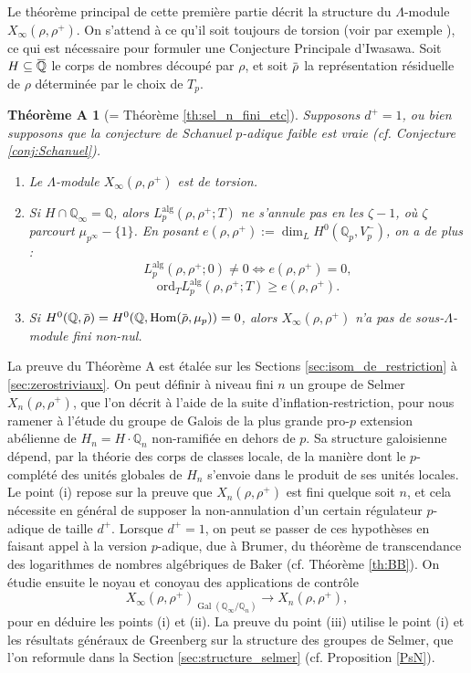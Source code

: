 \documentclass[12pt]{amsart}
\newcommand\bQ{\mathbb{Q}}
\newcommand\Qp{\mathbb{Q}_{p}}
\newcommand{\ob}[1]{\mkern 1.5mu\overline{\mkern-1.5mu#1\mkern-1.5mu}\mkern 1.5mu}
\newcommand{\ord}{\mathrm{ord}}
\newcommand{\alg}{\textrm{alg}}
\DeclareMathOperator{\Gal}{Gal}
\DeclareMathOperator{\Hom}{Hom}
\theoremstyle{defstyle}
\theoremstyle{thmstyle}
\newtheorem*{thA}{Théorème A}
\begin{document}
Le théorème principal de cette première partie décrit la structure du $\Lambda$-module $X_\infty(\rho,\rho^+)$. On s'attend à ce qu'il soit toujours de torsion (voir par exemple \cite[Conjecture 3.3]{greenbergdeformation}), ce qui est nécessaire pour formuler une Conjecture Principale d'Iwasawa. Soit $H\subseteq \ob{\bQ}$ le corps de nombres découpé par $\rho$, et soit $\ob{\rho}$ la représentation résiduelle de $\rho$ déterminée par le choix de $T_p$.

\begin{thA}[= Théorème \ref{th:sel_n_fini_etc}]
	Supposons $d^+=1$, ou bien supposons que la conjecture de Schanuel $p$-adique faible est vraie (cf. Conjecture \ref{conj:Schanuel}).
	\begin{enumerate}
		\item[(i)] Le $\Lambda$-module $X_\infty(\rho,\rho^+)$ est de torsion.
		\item[(ii)] Si $H\cap \bQ_\infty =\bQ$, alors $L_p^{\alg}(\rho,\rho^+;T)$ ne s'annule pas en les $\zeta-1$, où $\zeta$ parcourt $\mu_{p^\infty}-\{1\}$. En posant $e(\rho,\rho^+):=\dim_L H^0(\Qp,V_p^-)$, on a de plus :
		$$L_p^{\alg}(\rho,\rho^+;0)\neq 0 \Longleftrightarrow e(\rho,\rho^+)=0,$$  
		$$\ord_{T} L_p^{\alg}(\rho,\rho^+;T) \geq e(\rho,\rho^+).$$
		
		\item[(iii)] Si $H^0(\bQ,\ob{\rho})=H^0(\bQ,\Hom(\ob{\rho},\mu_p))=0$, alors $X_\infty(\rho,\rho^+)$ n'a pas de sous-$\Lambda$-module fini non-nul.
	\end{enumerate}
	
\end{thA}

La preuve du Théorème A est étalée sur les Sections \ref{sec:isom_de_restriction} à \ref{sec:zerostriviaux}. On peut définir à niveau fini $n$ un groupe de Selmer $X_n(\rho,\rho^+)$,  que l'on décrit à l'aide de la suite d'inflation-restriction, pour nous ramener à l'étude du groupe de Galois de la plus grande pro-$p$ extension abélienne de $H_n=H\cdot \bQ_n$ non-ramifiée en dehors de $p$. Sa structure galoisienne dépend, par la théorie des corps de classes locale, de la manière dont le $p$-complété des unités globales de $H_n$ s'envoie dans le produit de ses unités locales. Le point (i) repose sur la preuve que $X_n(\rho,\rho^+)$ est fini quelque soit $n$, et cela nécessite en général de supposer la non-annulation d'un certain régulateur $p$-adique de taille $d^+$. Lorsque $d^+=1$, on peut se passer de ces hypothèses en faisant appel à la version $p$-adique, due à Brumer, du théorème  de transcendance des logarithmes de nombres algébriques de Baker (cf. Théorème \ref{th:BB}). On étudie ensuite le noyau et conoyau des applications de contrôle 
$$X_\infty( \rho,\rho^+)_{\Gal(\bQ_\infty/\bQ_n)} \longrightarrow X_n(\rho,\rho^+),$$
pour en déduire les points (i) et (ii). La preuve du point (iii) utilise le point (i) et les résultats généraux de Greenberg sur la structure des groupes de Selmer, que l'on reformule dans la Section \ref{sec:structure_selmer} (cf. Proposition \ref{PsN}).
\end{document}
